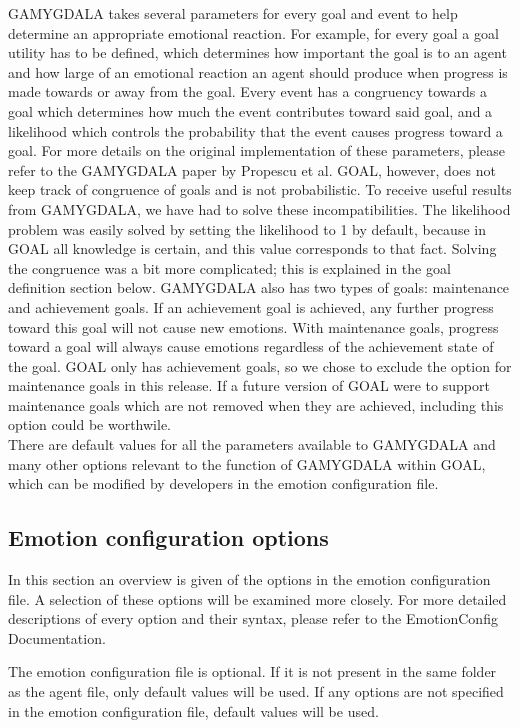 \documentclass[11pt]{article}
\begin{document}
GAMYGDALA takes several parameters for every goal and event to help determine an appropriate emotional reaction. For example, for every goal a goal utility has to be defined, which determines how important the goal is to an agent and how large of an emotional reaction an agent should produce when progress is made towards or away from the goal. Every event has a congruency towards a goal which determines how much the event contributes toward said goal, and a likelihood which controls the probability that the event causes progress toward a goal. For more details on the original implementation of these parameters, please refer to the GAMYGDALA paper by Propescu et al.\cite{GAMYGDALA}
GOAL\cite{GOAL Env}, however, does not keep track of congruence of goals and is not probabilistic. To receive useful results from GAMYGDALA, we have had to solve these incompatibilities. The likelihood problem was easily solved by setting the likelihood to 1 by default, because in GOAL all knowledge is certain, and this value corresponds to that fact. Solving the congruence was a bit more complicated; this is explained in the goal definition section below.
GAMYGDALA also has two types of goals: maintenance and achievement goals. If an achievement goal is achieved, any further progress toward this goal will not cause new emotions. With maintenance goals, progress toward a goal will always cause emotions regardless of the achievement state of the goal. GOAL only has achievement goals, so we chose to exclude the option for maintenance goals in this release. If a future version of GOAL were to support maintenance goals which are not removed when they are achieved, including this option could be worthwile.\\
There are default values for all the parameters available to GAMYGDALA and many other options relevant to the function of GAMYGDALA within GOAL, which can be modified by developers in the emotion configuration file.


\subsection{Emotion configuration options}
In this section an overview is given of the options in the emotion configuration file. A selection of these options will be examined more closely. For more detailed descriptions of every option and their syntax, please refer to the EmotionConfig Documentation\cite{emotionconfig}. 

The emotion configuration file is optional. If it is not present in the same folder as the agent file, only default values will be used. If any options are not specified in the emotion configuration file, default values will be used.
\end{document}
